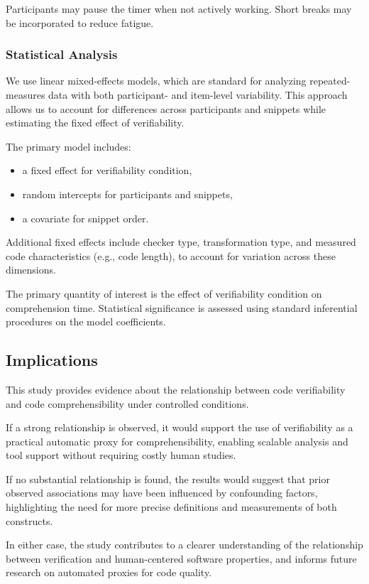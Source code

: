 Participants may pause the timer when not actively working. Short breaks may be incorporated to reduce fatigue.


\subsubsection{Statistical Analysis}

We use linear mixed-effects models, which are standard for analyzing repeated-measures data with both participant- and item-level variability. This approach allows us to account for differences across participants and snippets while estimating the fixed effect of verifiability.

The primary model includes:
\begin{itemize}
    \item a fixed effect for verifiability condition,
    \item random intercepts for participants and snippets,
    \item a covariate for snippet order.
\end{itemize}

Additional fixed effects include checker type, transformation type, and measured code characteristics (e.g., code length), to account for variation across these dimensions.

The primary quantity of interest is the effect of verifiability condition on comprehension time. Statistical significance is assessed using standard inferential procedures on the model coefficients.

\subsection{Implications}
This study provides evidence about the relationship between code verifiability and code comprehensibility under controlled conditions. 

If a strong relationship is observed, it would support the use of verifiability as a practical automatic proxy for comprehensibility, enabling scalable analysis and tool support without requiring costly human studies. 

If no substantial relationship is found, the results would suggest that prior observed associations may have been influenced by confounding factors, highlighting the need for more precise definitions and measurements of both constructs.

In either case, the study contributes to a clearer understanding of the relationship between verification and human-centered software properties, and informs future research on automated proxies for code quality.


